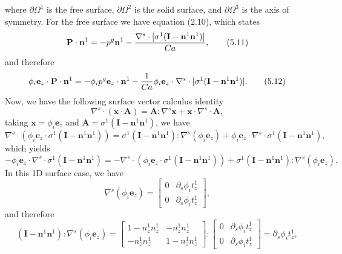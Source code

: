 \documentclass{article}
\begin{document}
where $\partial \Omega^{1}$ is the free surface, $\partial \Omega^{2}$ is the solid surface, and $\partial \Omega^{3}$ is the axis of symmetry. For the free surface we have equation (2.10), which states
\begin{equation}
\mathbf{P} \cdot \mathbf{n}^1 = -p^g \mathbf{n}^1 - \frac{\nabla^s \cdot [\sigma^1 (\mathbf{I} - \mathbf{n}^1 \mathbf{n}^1)]}{Ca}, \tag{5.11}
\end{equation}
and therefore
\begin{equation}
\phi_i \mathbf{e}_z \cdot \mathbf{P} \cdot \mathbf{n}^1 = -\phi_i p^g \mathbf{e}_z \cdot \mathbf{n}^1 - \frac{1}{Ca} \phi_i \mathbf{e}_z \cdot \nabla^s \cdot [\sigma^1 (\mathbf{I} - \mathbf{n}^1 \mathbf{n}^1)]. \tag{5.12}
\end{equation}
Now, we have the following surface vector calculus identity
\begin{equation}
\nabla^s \cdot (\mathbf{x} \cdot \mathbf{A}) = \mathbf{A} : \nabla^s \mathbf{x} + \mathbf{x} \cdot \nabla^s \cdot \mathbf{A}, \tag{5.13}
\end{equation}
taking $\mathbf{x} = \phi_i \mathbf{e}_z$ and $\mathbf{A} = \sigma^1 (\mathbf{I} - \mathbf{n}^1 \mathbf{n}^1)$, we have
\begin{equation}
\nabla^s \cdot (\phi_i \mathbf{e}_z \cdot \sigma^1 (\mathbf{I} - \mathbf{n}^1 \mathbf{n}^1)) = \sigma^1 (\mathbf{I} - \mathbf{n}^1 \mathbf{n}^1) : \nabla^s (\phi_i \mathbf{e}_z) + \phi_i \mathbf{e}_z \cdot \nabla^s \cdot \sigma^1 (\mathbf{I} - \mathbf{n}^1 \mathbf{n}^1), \tag{5.14}
\end{equation}
which yields
\begin{equation}
-\phi_i \mathbf{e}_z \cdot \nabla^s \cdot \sigma^1 (\mathbf{I} - \mathbf{n}^1 \mathbf{n}^1) = -\nabla^s \cdot (\phi_i \mathbf{e}_z \cdot \sigma^1 (\mathbf{I} - \mathbf{n}^1 \mathbf{n}^1)) + \sigma^1 (\mathbf{I} - \mathbf{n}^1 \mathbf{n}^1) : \nabla^s (\phi_i \mathbf{e}_z). \tag{5.15}
\end{equation}
In this 1D surface case, we have
\begin{equation}
\nabla^s (\phi_i \mathbf{e}_z) = \begin{bmatrix} 0 & \partial_s \phi_i t_z^1 \\ 0 & \partial_s \phi_i t_z^1 \end{bmatrix}, \tag{5.16}
\end{equation}
and therefore
\begin{equation}
(\mathbf{I} - \mathbf{n}^1 \mathbf{n}^1) : \nabla^s (\phi_i \mathbf{e}_z) = \begin{bmatrix} 1 - n_z^1 n_z^1 & -n_z^1 n_z^1 \\ -n_z^1 n_z^1 & 1 - n_z^1 n_z^1 \end{bmatrix} : \begin{bmatrix} 0 & \partial_s \phi_i t_z^1 \\ 0 & \partial_s \phi_i t_z^1 \end{bmatrix} = \partial_s \phi_i t_z^1, \tag{5.17}
\end{equation}
\end{document}
